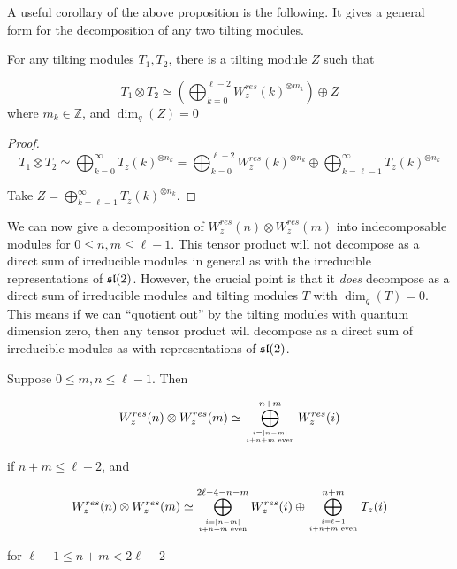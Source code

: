 A useful corollary of the above proposition is the following. It gives a
general form for the decomposition of any two tilting modules.

\begin{corollary}
\label{theorem:tensortilting}
    For any tilting modules $T_1, T_2$, there is a tilting module $Z$ such that 

    \begin{equation}
            T_1 \otimes T_2 \simeq \left(\bigoplus_{k=0}^{\ell - 2} W_z^{res}(k)^{\otimes m_k}\right) \oplus Z
    \end{equation}
    where $m_k \in \mathbb{Z}$, and $\dim_q(Z) = 0$
\end{corollary}
\begin{proof}
\begin{equation}
    T_1 \otimes T_2 \simeq \bigoplus_{k=0}^{\infty} T_z(k)^{\otimes n_k} =
    \bigoplus_{k=0}^{\ell-2} W_z^{res}(k)^{\otimes n_k} \oplus
    \bigoplus_{k=\ell-1}^{\infty} T_z(k)^{\otimes n_k}
\end{equation}

Take $Z = \displaystyle\bigoplus_{k=\ell-1}^{\infty} T_z(k)^{\otimes n_k}$.
\end{proof}

We can now give a decomposition of $W_z^{res}(n) \otimes W_z^{res}(m)$ into
indecomposable modules for $0 \leq n,m \leq \ell-1$.  This tensor product will
not decompose as a direct sum of irreducible modules in general as with the
irreducible representations of $\mathfrak{sl}(2)$. However, the crucial point is that it
\emph{does} decompose as a direct sum of irreducible modules and tilting
modules $T$ with $\dim_q(T) = 0$. This means if we can ``quotient out'' by the
tilting modules with quantum dimension zero, then any tensor product will
decompose as a direct sum of irreducible modules as with representations of
$\mathfrak{sl}(2)$.

\begin{prop}
\label{theorem:decomposition}
Suppose $0 \leq m,n \leq \ell - 1$. Then

\begin{equation}
W_z^{res}(n) \otimes W_{z}^{res}(m) \simeq \bigoplus_{i=|n-m| \atop i + n + m \text{ even}}^{n+m} W_z^{res}(i) 
\end{equation}

if $n+m \leq \ell - 2$, and 

\begin{equation}
W_z^{res}(n) \otimes W_{z}^{res}(m) \simeq \bigoplus_{i=|n-m| \atop i + n + m \text{ even}}^{2\ell - 4 - n - m} W_z^{res}(i) 
                                    \oplus \bigoplus_{i = \ell - 1 \atop i + n + m \text{ even}} ^{n + m} T_z(i)
\end{equation}

for $\ell - 1 \leq n + m < 2\ell - 2$
\end{prop}


